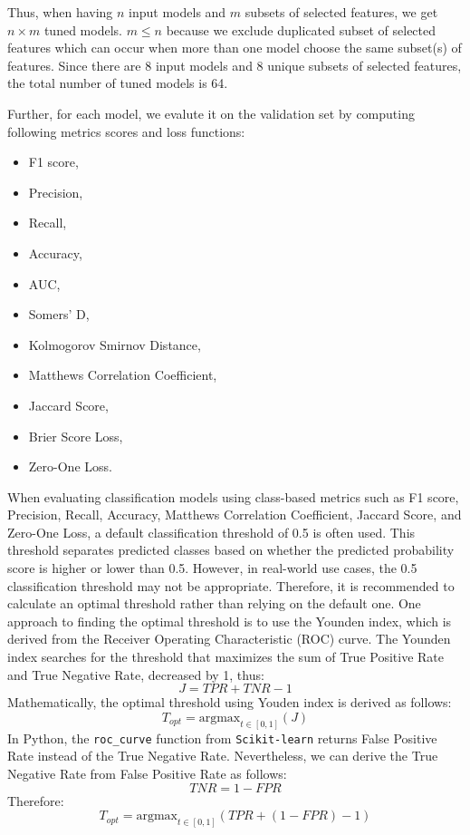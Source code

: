 Thus, when having $n$ input models and $m$ subsets of selected features, we get $n \times m$ tuned models.
$m \leq n$ because we exclude duplicated subset of selected features which can occur when more than one model choose the same subset(s) of features.
Since there are 8 input models and 8 unique subsets of selected features, the total number of tuned models is 64.

Further, for each model, we evalute it on the validation set by computing following metrics scores and loss functions:
\begin{itemize}\setlength\itemsep{0em}
    \item F1 score,
    \item Precision,
    \item Recall,
    \item Accuracy,
    \item AUC,
    \item Somers' D,
    \item Kolmogorov Smirnov Distance,
    \item Matthews Correlation Coefficient,
    \item Jaccard Score,
    \item Brier Score Loss,
    \item Zero-One Loss.
\end{itemize}

When evaluating classification models using class-based metrics such as F1 score, Precision, Recall, Accuracy, Matthews Correlation Coefficient, Jaccard Score, and Zero-One Loss, a default classification threshold of 0.5 is often used. This threshold separates predicted classes based on whether the predicted probability score is higher or lower than 0.5.
However, in real-world use cases, the 0.5 classification threshold may not be appropriate. Therefore, it is recommended to calculate an optimal threshold rather than relying on the default one.
One approach to finding the optimal threshold is to use the Younden index, which is derived from the Receiver Operating Characteristic (ROC) curve. The Younden index searches for the threshold that maximizes the sum of True Positive Rate and True Negative Rate, decreased by 1, thus:
\begin{equation}\label{eq}
J = TPR + TNR - 1
\end{equation}
Mathematically, the optimal threshold using Youden index is derived as follows:
\begin{equation}\label{eq}
    T_{opt} = \text{argmax}_{t \in [0, 1]}\left(J\right)
\end{equation}
In Python, the \lstinline{roc_curve} function from \lstinline{Scikit-learn} returns False Positive Rate instead of the True Negative Rate. Nevertheless, we can derive the True Negative Rate from False Positive Rate as follows:
\begin{equation}\label{eq}
    TNR =  1-FPR
\end{equation}
Therefore:
\begin{equation}\label{eq}
    T_{opt} = \text{argmax}_{t \in [0, 1]}\left(TPR +  \left(1-FPR\right) - 1\right)
\end{equation}

